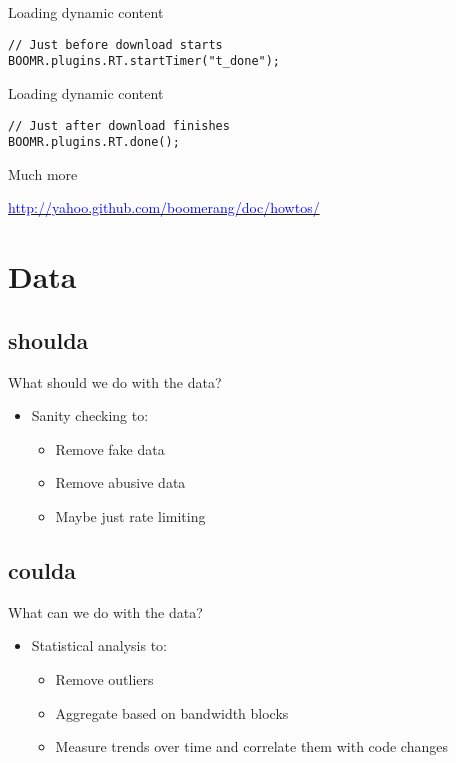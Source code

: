 \documentclass{beamer}
\begin{document}
\begin{frame}[fragile]{Loading dynamic content}
\begin{verbatim}
// Just before download starts
BOOMR.plugins.RT.startTimer("t_done");
\end{verbatim}
\end{frame}

\begin{frame}[fragile]{Loading dynamic content}
\begin{verbatim}
// Just after download finishes
BOOMR.plugins.RT.done();
\end{verbatim}
\end{frame}

\begin{frame}{Much more}
  \begin{center}
  \href{http://yahoo.github.com/boomerang/doc/howtos/}{\textcolor{blue}{http://yahoo.github.com/boomerang/doc/howtos/}}
  \end{center}
\end{frame}

\section{Data}
\label{sec:data}

\subsection{shoulda}

\begin{frame}{What should we do with the data?}
  \begin{itemize}
  \item Sanity checking to:
    \begin{itemize}
    \item Remove fake data
    \item Remove abusive data
    \item Maybe just rate limiting
    \end{itemize}
  \end{itemize}
\end{frame}

\subsection{coulda}
\begin{frame}{What can we do with the data?}
  \begin{itemize}
  \item Statistical analysis to:
    \begin{itemize}
    \item Remove outliers
    \item Aggregate based on bandwidth blocks
    \item Measure trends over time and correlate them with code changes
    \end{itemize}
  \end{itemize}
\end{frame}
\end{document}
